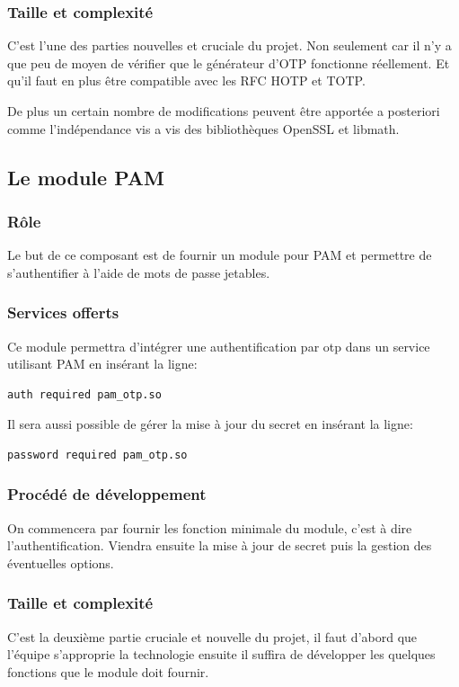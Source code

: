 \documentclass{"../../res/univ-projet"}
\begin{document}
\subsubsection{Taille et complexité}
C'est l'une des parties nouvelles et cruciale du projet. Non seulement car il n'y 
a que peu de moyen de vérifier que le générateur d'OTP fonctionne réellement. Et
qu'il faut en plus être compatible avec les RFC HOTP et TOTP.

De plus un certain nombre de modifications peuvent être apportée a posteriori comme 
l'indépendance vis a vis des bibliothèques OpenSSL et libmath.

\subsection{Le module PAM}
\subsubsection{Rôle}
Le but de ce composant est de fournir un module pour PAM et permettre de s'authentifier
à l'aide de mots de passe jetables.

\subsubsection{Services offerts}
Ce module permettra d'intégrer une authentification par otp dans un service utilisant PAM
en insérant la ligne:
\begin{verbatim}
auth required pam_otp.so
\end{verbatim}
Il sera aussi possible de gérer la mise à jour du secret en insérant la ligne:
\begin{verbatim}
password required pam_otp.so
\end{verbatim}

\subsubsection{Procédé de développement}
On commencera par fournir les fonction minimale du module, c'est à dire l'authentification. Viendra
ensuite la mise à jour de secret puis la gestion des éventuelles options.

\subsubsection{Taille et complexité}
C'est la deuxième partie cruciale et nouvelle du projet, il faut d'abord que l'équipe s'approprie
la technologie ensuite il suffira de développer les quelques fonctions que le module doit fournir.
\end{document}
